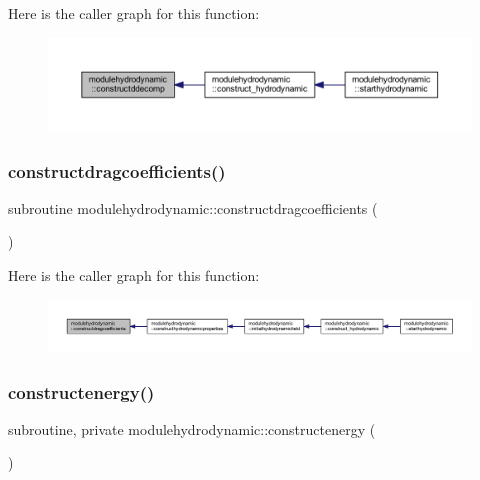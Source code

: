 Here is the caller graph for this function\+:\nopagebreak
\begin{figure}[H]
\begin{center}
\leavevmode
\includegraphics[width=350pt]{namespacemodulehydrodynamic_ac05ecc81fa8270b9ed0247f513b0c5d9_icgraph}
\end{center}
\end{figure}
\mbox{\label{namespacemodulehydrodynamic_ae2c9c19e22a3490a8d02e575bf8dd5a7}} 
\subsubsection{\texorpdfstring{constructdragcoefficients()}{constructdragcoefficients()}}
{\footnotesize\ttfamily subroutine modulehydrodynamic\+::constructdragcoefficients (\begin{DoxyParamCaption}{ }\end{DoxyParamCaption})\hspace{0.3cm}{\ttfamily [private]}}

Here is the caller graph for this function\+:\nopagebreak
\begin{figure}[H]
\begin{center}
\leavevmode
\includegraphics[width=350pt]{namespacemodulehydrodynamic_ae2c9c19e22a3490a8d02e575bf8dd5a7_icgraph}
\end{center}
\end{figure}
\mbox{\label{namespacemodulehydrodynamic_a048299b4cfb1c4c013ad653ff9e85f70}} 
\subsubsection{\texorpdfstring{constructenergy()}{constructenergy()}}
{\footnotesize\ttfamily subroutine, private modulehydrodynamic\+::constructenergy (\begin{DoxyParamCaption}{ }\end{DoxyParamCaption})\hspace{0.3cm}{\ttfamily [private]}}

